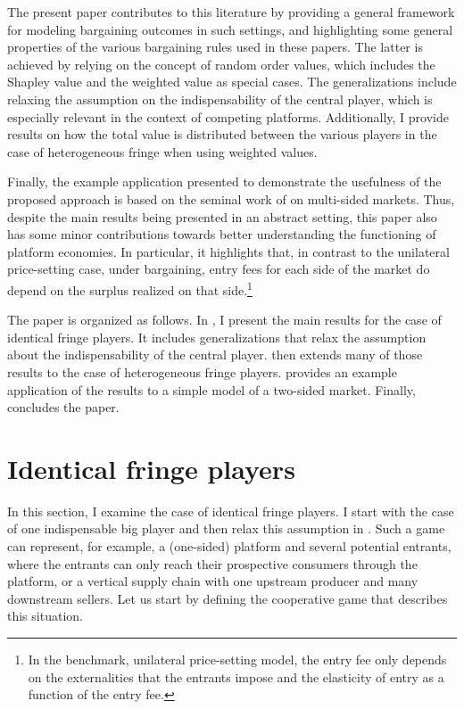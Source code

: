 The present paper contributes to this literature by providing a general framework for modeling bargaining outcomes in such settings, and highlighting some general properties of the various bargaining rules used in these papers.
The latter is achieved by relying on the concept of random order values, which includes the Shapley value and the weighted value as special cases.
The generalizations include relaxing the assumption on the indispensability of the central player, which is especially relevant in the context of competing platforms.
Additionally, I provide results on how the total value is distributed between the various players in the case of heterogeneous fringe when using weighted values.

Finally, the example application presented to demonstrate the usefulness of the proposed approach is based on the seminal work of \textcite{armstrong2006competition} on multi-sided markets.
Thus, despite the main results being presented in an abstract setting, this paper also has some minor contributions towards better understanding the functioning of platform economies.
In particular, it highlights that, in contrast to the unilateral price-setting case, under bargaining, entry fees for each side of the market do depend on the surplus realized on that side.\footnote{
    In the benchmark, unilateral price-setting model, the entry fee only depends on the externalities that the entrants impose and the elasticity of entry as a function of the entry fee.
}

The paper is organized as follows.
In , I present the main results for the case of identical fringe players.
It includes generalizations that relax the assumption about the indispensability of the central player.
 then extends many of those results to the case of heterogeneous fringe players.
 provides an example application of the results to a simple model of a two-sided market.
Finally,  concludes the paper.


\section{Identical fringe players}
\label{sec:one_sided}

In this section, I examine the case of identical fringe players.
I start with the case of one indispensable big player and then relax this assumption in .
Such a game can represent, for example, a (one-sided) platform and several potential entrants, where the entrants can only reach their prospective consumers through the platform, or a vertical supply chain with one upstream producer and many downstream sellers.
Let us start by defining the cooperative game that describes this situation.

